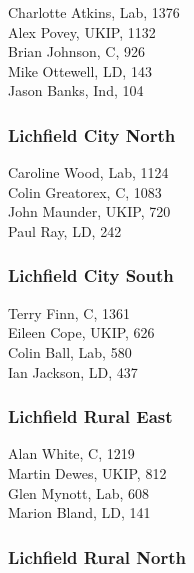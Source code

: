 \documentclass[a4paper,openany,10pt]{book}
\begin{document}
Charlotte Atkins, Lab, 1376\\
Alex Povey, UKIP, 1132\\
Brian Johnson, C, 926\\
Mike Ottewell, LD, 143\\
Jason Banks, Ind, 104\\


\subsubsection*{Lichfield City North}



Caroline Wood, Lab, 1124\\
Colin Greatorex, C, 1083\\
John Maunder, UKIP, 720\\
Paul Ray, LD, 242\\


\subsubsection*{Lichfield City South}



Terry Finn, C, 1361\\
Eileen Cope, UKIP, 626\\
Colin Ball, Lab, 580\\
Ian Jackson, LD, 437\\


\subsubsection*{Lichfield Rural East}



Alan White, C, 1219\\
Martin Dewes, UKIP, 812\\
Glen Mynott, Lab, 608\\
Marion Bland, LD, 141\\


\subsubsection*{Lichfield Rural North}

\end{document}
